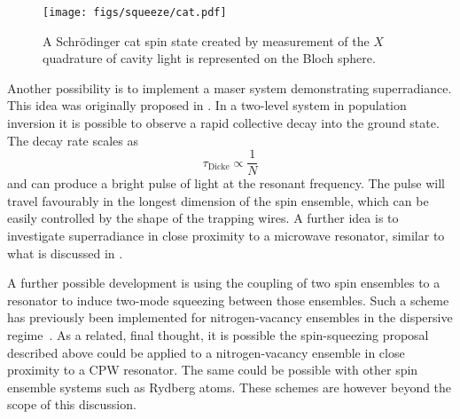 \begin{figure}[htbp]
  \centering
  \texttt{[image: figs/squeeze/cat.pdf]}
  \caption[Representation of a Schr\"odinger cat spin state]{
    A Schr\"odinger cat spin state created by measurement of the $X$
  quadrature of cavity light is represented on the Bloch sphere.}
  \label{squeeze:fig:cat}
\end{figure}

Another possibility is to implement a maser system demonstrating superradiance.
This idea was originally proposed in . %
In a two-level system in population inversion it is possible to observe
a rapid collective decay into the ground state. The decay rate scales as
%
\begin{equation}
  \tau_\text{Dicke} \propto \frac{1}{N}
\end{equation}
% 
and can produce a bright pulse of light at the resonant frequency. The pulse
will travel favourably in the longest dimension of the spin ensemble, which can
be easily controlled by the shape of the trapping wires. A further idea is to
investigate superradiance in close proximity to a microwave resonator, similar
to what is discussed in .

A further possible development is using the coupling of two spin ensembles to a
resonator to induce two-mode squeezing between those ensembles. Such a scheme
has previously been implemented for nitrogen-vacancy ensembles in the
dispersive regime~\cite{PhysRevA.99.012325}. As a related, final thought, it
is possible the spin-squeezing proposal described above could be applied to a
nitrogen-vacancy ensemble in close proximity to a CPW resonator. The same could
be possible with other spin ensemble systems such as Rydberg atoms. These
schemes are however beyond the scope of this discussion.
